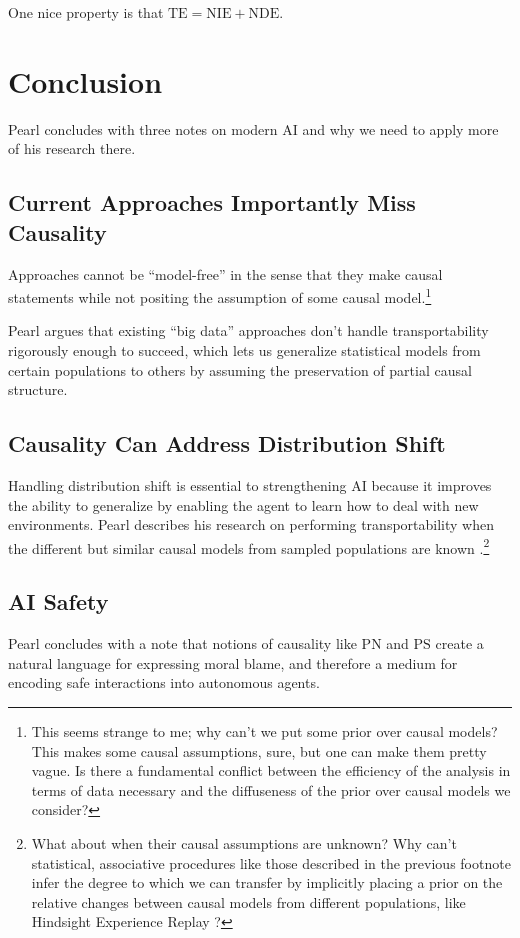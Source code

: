 \documentclass{article}
\begin{document}
One nice property is that $\mathrm{TE}=\mathrm{NIE}+\mathrm{NDE}$.

\section{Conclusion}

Pearl concludes with three notes on modern AI and why we need to apply more of his research there.

\subsection{Current Approaches Importantly Miss Causality}

Approaches cannot be ``model-free'' in the sense that they make causal statements while not positing the assumption of some causal model.\footnote{This seems strange to me; why can't we put some prior over causal models? This makes some causal assumptions, sure, but one can make them pretty vague. Is there a fundamental conflict between the efficiency of the analysis in terms of data necessary and the diffuseness of the prior over causal models we consider?}

Pearl argues that existing ``big data'' approaches don't handle transportability rigorously enough to succeed, which lets us generalize statistical models from certain populations to others by assuming the preservation of partial causal structure.

\subsection{Causality Can Address Distribution Shift}

Handling distribution shift is essential to strengthening AI because it improves the ability to generalize by enabling the agent to learn how to deal with new environments. Pearl describes his research on performing transportability when the different but similar causal models from sampled populations are known \cite{pearl2014external}.\footnote{What about when their causal assumptions are unknown? Why can't statistical, associative procedures like those described in the previous footnote infer the degree to which we can transfer by implicitly placing a prior on the relative changes between causal models from different populations, like Hindsight Experience Replay \cite{andrychowicz2017hindsight}?}

\subsection{AI Safety}

Pearl concludes with a note that notions of causality like $\mathrm{PN}$ and $\mathrm{PS}$ create a natural language for expressing moral blame, and therefore a medium for encoding safe interactions into autonomous agents.

{}

\end{document}
